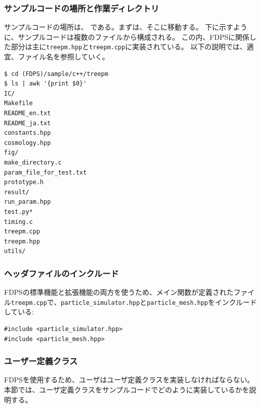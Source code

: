 \subsubsection{サンプルコードの場所と作業ディレクトリ}
サンプルコードの場所は、 である。まずは、そこに移動する。
下に示すように、サンプルコードは複数のファイルから構成される。
この内、FDPSに関係した部分は主に\texttt{treepm.hpp}と\texttt{treepm.cpp}に実装されている。
以下の説明では、適宜、ファイル名を参照していく。
\begin{screen}
\begin{verbatim}
$ cd (FDPS)/sample/c++/treepm
$ ls | awk '{print $0}'
IC/
Makefile
README_en.txt
README_ja.txt
constants.hpp
cosmology.hpp
fig/
make_directory.c
param_file_for_test.txt
prototype.h
result/
run_param.hpp
test.py*
timing.c
treepm.cpp
treepm.hpp
utils/
\end{verbatim}
\end{screen}

\subsubsection{ヘッダファイルのインクルード}
FDPSの標準機能と拡張機能の両方を使うため、メイン関数が定義されたファイル\texttt{treepm.cpp}で、\texttt{particle\_simulator.hpp}と\texttt{particle\_mesh.hpp}をインクルードしている:
\begin{lstlisting}[caption=Include FDPS]
#include <particle_simulator.hpp>
#include <particle_mesh.hpp>
\end{lstlisting}

\subsubsection{ユーザー定義クラス}
FDPSを使用するため、ユーザはユーザ定義クラスを実装しなければならない。
本節では、ユーザ定義クラスをサンプルコードでどのように実装しているかを説明する。

